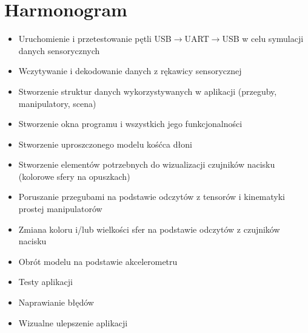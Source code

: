 \documentclass[12pt,a4paper]{article}
\begin{document}
\section{Harmonogram}
\begin{itemize}
\item Uruchomienie i przetestowanie pętli USB$\rightarrow $UART$\rightarrow $USB w celu symulacji danych sensorycznych
\item Wczytywanie i dekodowanie danych z rękawicy sensorycznej
\item Stworzenie struktur danych wykorzystywanych w aplikacji (przeguby, manipulatory, scena)
\item Stworzenie okna programu i wszystkich jego funkcjonalności
\item Stworzenie uproszczonego modelu kośćca dłoni
\item Stworzenie elementów potrzebnych do wizualizacji czujników nacisku (kolorowe sfery na opuszkach)
\item Poruszanie przegubami na podstawie odczytów z tensorów i kinematyki prostej manipulatorów
\item Zmiana koloru i/lub wielkości sfer na podstawie odczytów z czujników nacisku
\item Obrót modelu na podstawie akcelerometru
\item Testy aplikacji
\item Naprawianie błędów
\item Wizualne ulepszenie aplikacji
\end{itemize}
\end{document}
